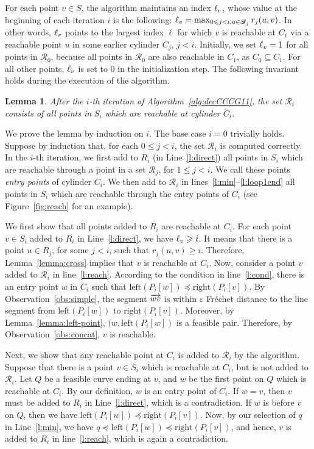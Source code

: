 \documentclass[12pt]{dalthesis}
\def\favoritefont{\bfseries \sffamily}
\def\QED{\ensuremath{{\Box}}}
\def\markatright#1{\leavevmode\unskip\nobreak\quad\hspace*{\fill}{#1}}
\newenvironment{proof}
	{\begin{trivlist}\item[\hskip\labelsep{\favoritefont Proof:}]}
	{\markatright{\QED}\end{trivlist}}
\newtheorem{lemma}[theorem]{Lemma}
\newcommand{\lee}{\leqslant}
\newcommand{\gee}{\geqslant}
\newcommand{\eps}{\varepsilon}
\newcommand{\CR}{{\mathscr R}}
\newcommand{\Frechet}{Fr\'echet }
\newcommand{\Left}{\mbox{left}}
\newcommand{\Right}{\mbox{right}}
\newcommand{\R}{\CR}
\newcommand{\lex}{\preceq}
\newcommand{\ri}{r}
\begin{document}
For each point $v \in S$, the algorithm maintains an index $\ell_v$, 
whose value at the beginning of each iteration $i$ is the following:
$\re_v = \max_{0 \lee j < i, u \in \R_j} \ri_j(u,v)$.
In other words, $\ell_v$ points to the largest index $\ell$ for which $v$ is reachable at $C_\ell$
via a reachable point $u$ in some earlier cylinder $C_j$, $j < i$.
Initially, we set $\ell_v  = 1$ for all points in $\R_0$,
because all points in $\R_0$ are also reachable in $C_1$, as $C_0 \subseteq C_1$.
For all other points, $\ell_v$ is set to 0 in the initialization step.
The following invariant holds during the execution of the algorithm.

\begin{lemma}\label{lemma:main}
	After the $i$-th iteration of Algorithm~\ref{alg:decCCCG11}, 
	the set $\R_{i}$ consists of all points in $S_i$ which are reachable at cylinder $C_i$.
\end{lemma}


\begin{proof}
	We prove the lemma by induction on $i$.
	The base case $i=0$ trivially holds.
	Suppose by induction that, for each $0 \lee j < i$,
	the set $\R_i$ is computed correctly.
	In the $i$-th iteration,
	we first add to $R_i$ (in Line~\ref{l:direct}) all points in $S_i$
	which are reachable through a point in a set $\R_j$, for $1 \lee j < i$.
	We call these points \emph{entry points} of cylinder $C_i$.
	We then add to $\R_i$ in lines~\ref{l:min}--\ref{l:loop1end} all points in $S_i$
	which are reachable through the entry points of $C_i$
	(see Figure~\ref{fig:reach} for an example).

	We first show that all points added to $R_i$ are reachable at $C_i$.
	For each point $v \in S_i$ added to $R_i$ in Line~\ref{l:direct},
	we have $\re_v \gee i$. 
	It means that there is a point $u \in R_j$, for some $j < i$, such that $\ri_j(u,v) \gee i$. 
	Therefore, Lemma~\ref{lemma:cross} implies that $v$ is reachable at $C_i$.
	Now, consider a point $v$ added to $\R_i$ in line~\ref{l:reach}.
	According to the condition in line~\ref{l:cond}, 
	there is an entry point $w$ in $C_i$ such that
	$\Left(P_i[w]) \lex \Right(P_i[v])$.
	By Observation~\ref{obs:simple}, the segment $\overrightarrow{wv}$ is 
	within $\eps$ \Frechet distance to the line segment
	from $\Left(P_i[w])$ to $\Right(P_i[v])$. 
	Moreover, by Lemma~\ref{lemma:left-point}, $(w, \Left(P_i[w])$ is a feasible pair.
	Therefore, by Observation~\ref{obs:concat},
	$v$ is reachable.
	
	Next, we show that
	any reachable point at $C_i$ is added to $\R_i$ by the algorithm.
	Suppose that there is 
	a point $v \in S_i$ which is reachable at $C_i$,
	but is not added to $\R_i$.
	Let $Q$ be a feasible curve ending at $v$,
	and $w$ be the first point on $Q$ which is reachable at $C_i$.
	By our definition, $w$ is an entry point of $C_i$.
	If $w = v$, then $v$ must be added to $R_i$ in Line~\ref{l:direct},
	which is a contradiction.
	If $w$ is before $v$ on $Q$,
	then we have $\Left(P_i[w]) \lex \Right(P_i[v])$.
	Now, by our selection of $q$ in Line~\ref{l:min},
	we have $q \lex \Left(P_i[w]) \lex \Right(P_i[v])$,
	and hence, $v$ is added to $R_i$ in line~\ref{l:reach},
	which is again a contradiction.
\end{proof}
\end{document}
